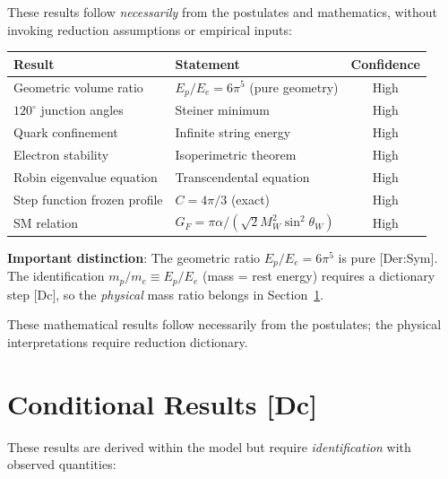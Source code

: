 These results follow \textit{necessarily} from the postulates and mathematics,
without invoking reduction assumptions or empirical inputs:

\begin{center}
\begin{tabular}{llc}
\toprule
\textbf{Result} & \textbf{Statement} & \textbf{Confidence} \\
\midrule
Geometric volume ratio & $E_p/E_e = 6\pi^5$ (pure geometry) & High \\
$120^\circ$ junction angles & Steiner minimum & High \\
Quark confinement & Infinite string energy & High \\
Electron stability & Isoperimetric theorem & High \\
Robin eigenvalue equation & Transcendental equation & High \\
Step function frozen profile & $C = 4\pi/3$ (exact) & High \\
SM relation & $G_F = \pi\alpha/(\sqrt{2}M_W^2\sin^2\theta_W)$ & High \\
\bottomrule
\end{tabular}
\end{center}

\textbf{Important distinction}: The geometric ratio $E_p/E_e = 6\pi^5$ is pure [Der:Sym].
The identification $m_p/m_e \equiv E_p/E_e$ (mass = rest energy) requires a dictionary
step [Dc], so the \textit{physical} mass ratio belongs in Section~\ref{sec:conditional}.

These mathematical results follow necessarily from the postulates; the physical
interpretations require reduction dictionary.

\section{Conditional Results [Dc]}
\label{sec:conditional}

These results are derived within the model but require \textit{identification}
with observed quantities:

